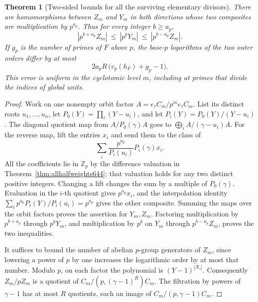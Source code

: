 \documentclass[a4paper,11pt]{article}
\newtheorem{theorem}[proposition]{Theorem}
\theoremstyle{definition}
\theoremstyle{remark}
\newcommand{\ZZ}{\mathbb Z}\newcommand{\ord}{\operatorname{ord}}
\numberwithin{equation}{section}
\begin{document}
\begin{theorem}[Two-sided bounds for all the surviving elementary divisors]
\leavevmode\label{thm:alltails648}
There are homomorphisms between \(Z_m\) and \(Y_m\) in both
directions whose two composites are multiplication by
\(p^{a_p}\). Thus for every integer \(b\ge a_p\),
\[
        |p^{b+a_p}Z_m|\ \le\ |p^bY_m|\
                                   \le\ |p^{b-a_p}Z_m|.
\]
If \(g_p\) is the number of primes of \(F\) above \(p\),
the base-\(p\) logarithms of the two outer orders differ by
at most
\[
                 2a_pR\,\big(v_p(h_F)+g_p-1\big).
\]
This error is uniform in the cyclotomic level \(m\), including
at primes that divide the indices of global units.
\end{theorem}
\begin{proof}
Work on one nonempty orbit factor \(A=e_\tau C_m/p^m e_\tau C_m\).
List its distinct roots \(u_1,\ldots,u_n\), let
\(P_0(Y)=\prod_i(Y-u_i)\), and let \(P_i(Y)=P_0(Y)/(Y-u_i)\).
The diagonal quotient map from \(A/P_0(\gamma)A\) goes to
\(\bigoplus_i A/(\gamma-u_i)A\). For the reverse map, lift
the entries \(x_i\) and send them to the class of
\[
       \sum_i \frac{p^{a_p}}{P_i(u_i)}P_i(\gamma)x_i .
\]
All the coefficients lie in \(\ZZ_p\) by the difference
valuation in Theorem~\ref{thm:allhalfweights644}; that
valuation holds for any two distinct positive integers.
Changing a lift changes the sum by a multiple of
\(P_0(\gamma)\). Evaluation in the \(i\)-th quotient gives
\(p^{a_p}x_i\), and the interpolation identity
\(\sum_i p^{a_p}P_i(Y)/P_i(u_i)=p^{a_p}\) gives the other
composite. Summing the maps over the orbit factors proves
the assertion for \(Y_m,Z_m\). Factoring multiplication by
\(p^{b+a_p}\) through \(p^bY_m\), and multiplication by
\(p^b\) on \(Y_m\) through \(p^{b-a_p}Z_m\), proves the
two inequalities.

It suffices to bound the number of abelian \(p\)-group
generators of \(Z_m\), since lowering a power of \(p\) by
one increases the logarithmic order by at most that number.
Modulo \(p\), on each factor the polynomial is
\((Y-1)^{|\mathcal R_\tau|}\).
Consequently \(Z_m/pZ_m\) is a quotient of
\(C_m/(p,(\gamma-1)^R)C_m\). The filtration by powers
of \(\gamma-1\) has at most \(R\) quotients, each an image
of \(C_m/(p,\gamma-1)C_m\).


\end{proof}
\end{document}
